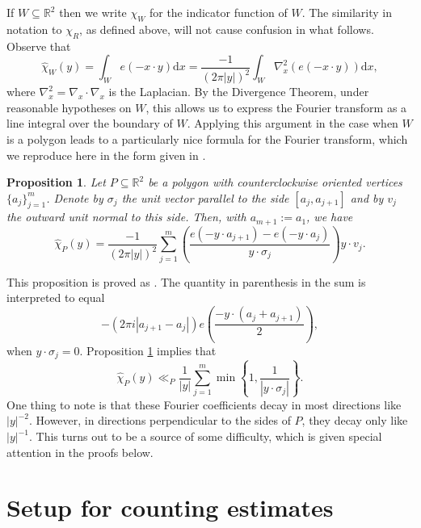 \documentclass[reqno]{amsart}
\newcommand{\R}{\mathbb{R}}
\newcommand{\mr}{\mathrm}
\newtheorem{proposition}[theorem]{Proposition}
\begin{document}
If $W\subseteq\R^2$ then we write $\chi_W$ for the indicator function of $W$. The similarity in notation to $\chi_R$, as defined above, will not cause confusion in what follows. Observe that
\[\widehat{\chi}_W(y)=\int_We(-x\cdot y)\mr{d}x=\frac{-1}{(2\pi|y|)^2}\int_W\nabla_x^2\left( e(-x\cdot y)\right)\mr{d}x,\]
where $\nabla_x^2=\nabla_x\cdot\nabla_x$ is the Laplacian. By the Divergence Theorem, under reasonable hypotheses on $W$, this allows us to express the Fourier transform as a line integral over the boundary of $W$. Applying this argument in the case when $W$ is a polygon leads to a particularly nice formula for the Fourier transform, which we reproduce here in the form given in \cite{BranColzTrav1997}.
\begin{proposition}\label{prop.FourTranPoly}
	Let $P\subseteq\R^2$ be a polygon with counterclockwise oriented vertices $\{a_j\}_{j=1}^m$. Denote by $\sigma_j$ the unit vector parallel to the side $[a_j,a_{j+1}]$ and by $v_j$ the outward unit normal to this side. Then, with $a_{m+1}:=a_1$, we have
	\[\widehat{\chi}_P(y)=\frac{-1}{(2\pi|y|)^2}\sum_{j=1}^m\left(\frac{e(-y\cdot a_{j+1})-e(-y\cdot a_{j})}{y\cdot \sigma_j}\right)y\cdot v_j.\]
\end{proposition}
This proposition is proved as \cite[Lemma 2.2]{BranColzTrav1997}. The quantity in parenthesis in the sum is interpreted to equal
\[-\left(2\pi i |a_{j+1}-a_j|\right)e\left(\frac{-y\cdot(a_j+a_{j+1})}{2}\right),\]
when $y\cdot\sigma_j=0$. Proposition \ref{prop.FourTranPoly} implies that
\begin{equation}\label{eqn.PolyFourEst}
	\widehat{\chi}_P(y)\ll_P \frac{1}{|y|}\sum_{j=1}^m\min\left\{1,\frac{1}{|y\cdot\sigma_j|}\right\}.
\end{equation}
One thing to note is that these Fourier coefficients decay in most directions like $|y|^{-2}$. However, in directions perpendicular to the sides of $P$, they decay only like $|y|^{-1}$. This turns out to be a source of some difficulty, which is given special attention in the proofs below.


\section{Setup for counting estimates}\label{sec.Setup}
\end{document}

